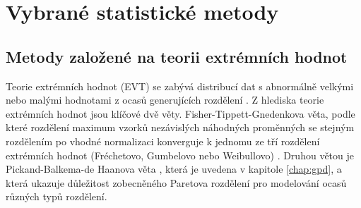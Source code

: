 \section{Vybrané statistické metody}

\subsection{Metody založené na teorii extrémních hodnot}
Teorie extrémních hodnot (EVT) se zabývá distribucí dat s abnormálně velkými nebo malými hodnotami z ocasů generujících rozdělení \cite{evt1}. Z hlediska teorie extrémních hodnot jsou klíčové dvě věty. Fisher-Tippett-Gnedenkova věta, podle které rozdělení maximum vzorků nezávislých náhodných proměnných se stejným rozdělením po vhodné normalizaci konverguje k jednomu ze tří rozdělení extrémních hodnot (Fréchetovo, Gumbelovo nebo Weibullovo) \cite{evt2}. Druhou větou je Pickand-Balkema-de Haanova věta \cite{gpd5,gpd6}, která je uvedena v kapitole \ref{chap:gpd}, a která ukazuje důležitost zobecněného Paretova rozdělení pro modelování ocasů různých typů rozdělení.
\par 
